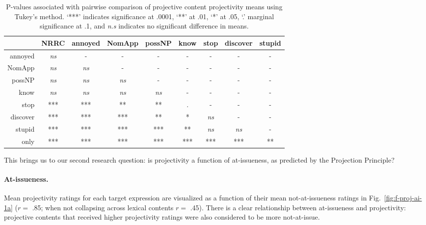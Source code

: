 \documentclass[11pt,fleqn]{article}
\newcommand{\6}{\mbox{$[\hspace*{-.6mm}[$}}
\newcommand{\9}{\mbox{$]\hspace*{-.6mm}]$}}
\newcommand{\figref}[1]{Fig.~\ref{#1}}
\begin{document}
\begin{table}[!h]
\begin{center}
\begin{tabular}{r c c c c c c c c}
\toprule
 &   NRRC & annoyed & NomApp &  possNP &  know & stop & discover & stupid \\
 \midrule
annoyed &  \emph{ns}  &  -  &        -   &       -  &        -  &   - &     -   &  -\\     
NomApp  &  \emph{ns} & \emph{ns} & -    &   -   &    -    &   -  &     -   & - \\    
possNP  &    \emph{ns} & \emph{ns} & \emph{ns} & - &      -  &     -     &  -   & - \\    
know     &   \emph{ns} & \emph{ns} & \emph{ns} & \emph{ns} & -   &    -   &    -       & -\\
stop     &   *** & *** & ** & ** & . & - &  - & -\\      
discover  &   *** & *** & *** & ** & * & \emph{ns} & - & -      \\
stupid    &  *** & *** & *** & *** & ** & \emph{ns} & \emph{ns} & - \\
only      &  *** & *** & *** & *** & *** & *** & *** & ** \\
\bottomrule
\end{tabular}
\caption{P-values associated with pairwise comparison of projective content projectivity means using Tukey's method. `***' indicates significance at .0001, `**' at .01, `*' at .05, `.' marginal significance at .1, and \emph{n.s} indicates no significant difference in means.}\label{tab:pairwise}
\end{center}
\end{table}

This brings us to our second research question: is projectivity a function of at-issueness, as predicted by the Projection Principle?

\paragraph{At-issueness.} Mean projectivity ratings for each target expression are visualized as a function of their mean not-at-issueness ratings in \figref{fig:f-proj-ai-1a} ($r =$ .85; when not collapsing across lexical contents $r =$ .45). There is a clear relationship between at-issueness and projectivity: projective contents that received higher projectivity ratings were also considered to be more not-at-issue.
\end{document}
